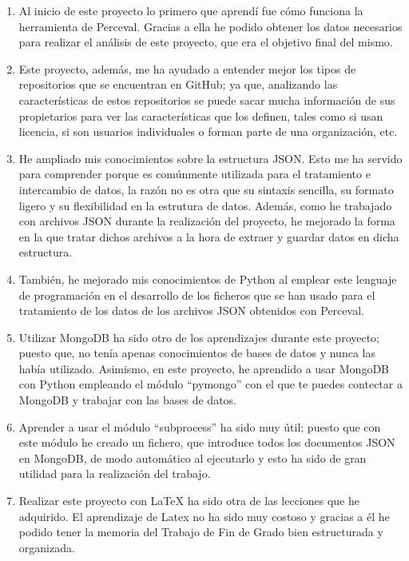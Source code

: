 \documentclass[a4paper, 12pt]{book}
\begin{document}
\begin{enumerate}
  \item  Al inicio de este proyecto lo primero que aprendí fue cómo funciona la herramienta de Perceval. Gracias a ella he podido obtener los datos necesarios para realizar el análisis de este proyecto, que era el objetivo final del mismo. 
  \item  Este proyecto, además, me ha ayudado a entender mejor los tipos de repositorios que se encuentran en GitHub; ya que, analizando las características de estos repositorios se puede sacar mucha información de sus propietarios para ver las características que los definen, tales como si usan licencia, si son usuarios individuales o forman parte de una organización, etc.
  \item  He ampliado mis conocimientos sobre la estructura JSON. Esto me ha servido para comprender porque es comúnmente utilizada para el tratamiento e intercambio de datos, la razón no es otra que su sintaxis sencilla, su formato ligero y su flexibilidad en la estrutura de datos. Además, como he trabajado con archivos JSON durante la realización del proyecto, he mejorado la forma en la que tratar dichos archivos a la hora de extraer y guardar datos en dicha estructura.  
  \item  También, he mejorado mis conocimientos de Python al emplear este lenguaje de programación en el desarrollo de los ficheros que se han usado para el tratamiento de los datos de los archivos JSON obtenidos con Perceval.    
  \item  Utilizar MongoDB ha sido otro de los aprendizajes durante este proyecto; puesto que, no tenía apenas conocimientos de bases de datos y nunca las había utilizado. Asimismo, en este proyecto, he aprendido a usar MongoDB con Python empleando el módulo ``pymongo'' con el que te puedes contectar a MongoDB y trabajar con las bases de datos.
  \item  Aprender a usar el módulo ``subprocess'' ha sido muy útil; puesto que con este módulo he  creado un fichero, que introduce todos los documentos JSON en MongoDB, de modo automático al ejecutarlo y esto ha sido de gran utilidad para la realización del trabajo.
  \item  Realizar este proyecto con LaTeX ha sido otra de las lecciones que he adquirido. El aprendizaje de Latex no ha sido muy costoso y gracias a él he podido tener la memoria del Trabajo de Fin de Grado bien estructurada y organizada.
\end{enumerate}
\end{document}
